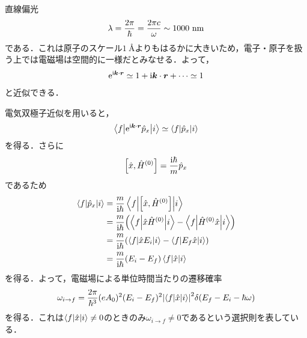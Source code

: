 \documentclass{report}
\begin{document}
\begin{myex}{直線偏光}{}
    \begin{align}
      \lambda = \frac{2\pi}{\hbar} = \frac{2\pi c}{\omega} \sim 1000\ \r{nm}
    \end{align}
    である．これは原子のスケール$1\ \si{\angstrom}$よりもはるかに大きいため，電子・原子を扱う上では電磁場は空間的に一様だとみなせる．よって，
    \begin{align}
      \mathrm{e}^{\mathrm{i}\bm{k}\cdot\bm{r}}\simeq 1 + \mathrm{i} \bm{k} \cdot \bm{r} + \cdots \simeq 1
    \end{align}
    と近似できる．
    \par
    電気双極子近似を用いると，
    \begin{align}
      \mel**{f}{\mathrm{e}^{\mathrm{i} \bm{k} \cdot \bm{r}}\hat{p}_x}{{i}} \simeq \mel**{f}{\hat{p}_x}{i}
    \end{align}
    を得る．さらに
    \begin{align}
      \qty[\hat{x}, \hat{H}^{(0)}] = \frac{\mathrm{i} \hbar}{m}\hat{p}_x
    \end{align}
    であるため
    \begin{align}
      \mel**{f}{\hat{p}_x}{i} &= \frac{m}{\mathrm{i}\hbar} \mel**{f}{\qty[\hat{x}, \hat{H}^{(0)}]}{i} \\ 
      &= \frac{m}{\mathrm{i}\hbar} \qty(\mel**{f}{\hat{x}\hat{H}^{(0)}}{i} - \mel**{f}{\hat{H}^{(0)}\hat{x}}{i}) \\ 
      &= \frac{m}{\mathrm{i}\hbar} \qty(\mel**{f}{\hat{x}E_i}{i} - \mel**{f}{E_f\hat{x}}{i}) \\ 
      &= \frac{m}{\mathrm{i}\hbar} (E_i - E_f)\mel**{f}{\hat{x}}{i}
    \end{align}
    を得る．よって，電磁場による単位時間当たりの遷移確率
    \begin{align}
      \omega_{i \to f} = \frac{2\pi}{\hbar^3} (eA_0)^2 (E_i - E_f)^2 \abs{\mel**{f}{\hat{x}}{i}}^2 \delta(E_f - E_i - \hbar\omega) 
    \end{align}
    を得る．これは$\mel**{f}{\hat{x}}{i} \neq 0$のときのみ$\omega_{i\to f} \neq 0$であるという選択則を表している．
  \end{myex}
\end{document}
